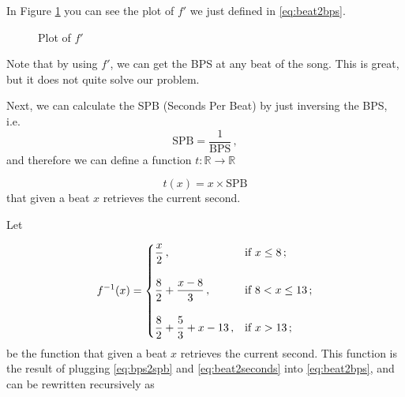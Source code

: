 \documentclass[a4paper,9pt]{article}
\begin{document}
    In Figure \ref{fig:beat2bps} you can see the plot of $f'$ we just defined in \eqref{eq:beat2bps}. 

\begin{figure}[htpb]
	\centering



	\caption{Plot of $f'$}
	\label{fig:beat2bps}
\end{figure}

Note that by using $f'$, we can get the BPS at any beat of the song. This is great, but it does not quite solve our problem. 

Next, we can calculate the SPB (Seconds Per Beat) by just inversing the BPS, i.e.
\begin{equation}
	\text{SPB} = \frac{1}{\text{BPS}}\,,
	\label{eq:bps2spb}
\end{equation}
and therefore we can define a function $t: \mathbb{R} \rightarrow \mathbb{R}$

\begin{equation}
	t(x) = x\times \text{SPB}
	\label{eq:beat2seconds}
\end{equation}
that given a beat $x$ retrieves the current second.

Let 



    \begin{equation}
	    f^{-1}(x) = \begin{dcases}
		    \frac{x}{2}\,, & \text{if $x \leq 8\,;$}\\[1em]
		    \frac{8}{2}+\frac{x-8}{3}\,, & \text{if $8 < x \leq 13\,;$}\\[1em]  
		    \frac{8}{2}+\frac{5}{3}+x- 13\,, & \text{if $x > 13\,;$}\\ 
	    \end{dcases}
	    \label{eq:beat2second}
    \end{equation}
    be the function that given a beat $x$ retrieves the current second. This function is the result of plugging \eqref{eq:bps2spb} and \eqref{eq:beat2seconds} into \eqref{eq:beat2bps}, and can be rewritten recursively as
\end{document}
